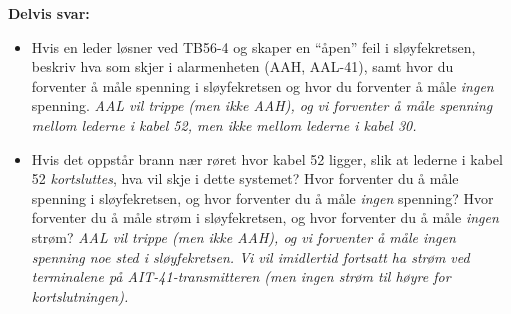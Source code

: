 





\noindent
{\bf Delvis svar:}

\begin{itemize}
\item{} Hvis en leder løsner ved TB56-4 og skaper en ``åpen'' feil i sløyfekretsen, beskriv hva som skjer i alarmenheten (AAH, AAL-41), samt hvor du forventer å måle spenning i sløyfekretsen og hvor du forventer å måle {\it ingen} spenning.  {\it AAL vil trippe (men ikke AAH), og vi forventer å måle spenning mellom lederne i kabel 52, men ikke mellom lederne i kabel 30.}
\vskip 10pt
\item{} Hvis det oppstår brann nær røret hvor kabel 52 ligger, slik at lederne i kabel 52 {\it kortsluttes}, hva vil skje i dette systemet?  Hvor forventer du å måle spenning i sløyfekretsen, og hvor forventer du å måle {\it ingen} spenning?  Hvor forventer du å måle strøm i sløyfekretsen, og hvor forventer du å måle {\it ingen} strøm?  {\it AAL vil trippe (men ikke AAH), og vi forventer å måle ingen spenning noe sted i sløyfekretsen.  Vi vil imidlertid fortsatt ha strøm ved terminalene på AIT-41-transmitteren (men ingen strøm til høyre for kortslutningen).}
\end{itemize}







